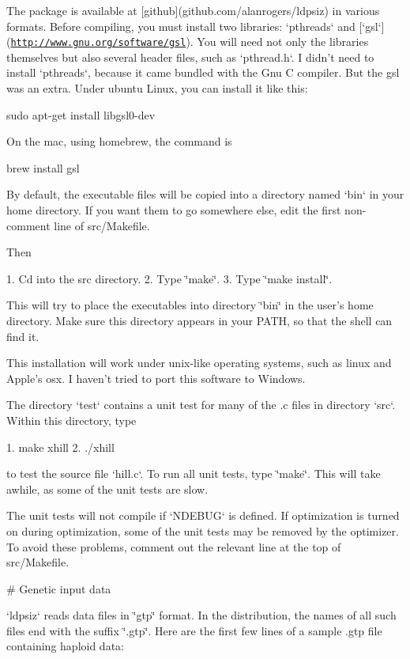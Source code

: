\-The package is available at \mbox{[}github\mbox{]}(github.\-com/alanrogers/ldpsiz) in various formats. \-Before compiling, you must install two libraries\-: `pthreads` and \mbox{[}`gsl`\mbox{]}(\href{http://www.gnu.org/software/gsl}{\tt http\-://www.\-gnu.\-org/software/gsl}). \-You will need not only the libraries themselves but also several header files, such as `pthread.h`. \-I didn't need to install `pthreads`, because it came bundled with the \-Gnu \-C compiler. \-But the gsl was an extra. \-Under ubuntu \-Linux, you can install it like this\-:

sudo apt-\/get install libgsl0-\/dev

\-On the mac, using homebrew, the command is

brew install gsl

\-By default, the executable files will be copied into a directory named `bin` in your home directory. \-If you want them to go somewhere else, edit the first non-\/comment line of src/\-Makefile.

\-Then

1. \-Cd into the src directory. 2. \-Type \char`\"{}make\char`\"{}. 3. \-Type \char`\"{}make install\char`\"{}.

\-This will try to place the executables into directory \char`\"{}bin\char`\"{} in the user's home directory. \-Make sure this directory appears in your \-P\-A\-T\-H, so that the shell can find it.

\-This installation will work under unix-\/like operating systems, such as linux and \-Apple's osx. \-I haven't tried to port this software to \-Windows.

\-The directory `test` contains a unit test for many of the .c files in directory `src`. \-Within this directory, type

1. make xhill 2. ./xhill

to test the source file `hill.c`. \-To run all unit tests, type \char`\"{}make\char`\"{}. \-This will take awhile, as some of the unit tests are slow.

\-The unit tests will not compile if `\-N\-D\-E\-B\-U\-G` is defined. \-If optimization is turned on during optimization, some of the unit tests may be removed by the optimizer. \-To avoid these problems, comment out the relevant line at the top of src/\-Makefile.

\# \-Genetic input data

`ldpsiz` reads data files in \char`\"{}gtp\char`\"{} format. \-In the distribution, the names of all such files end with the suffix \char`\"{}.\-gtp\char`\"{}. \-Here are the first few lines of a sample .gtp file containing haploid data\-:

